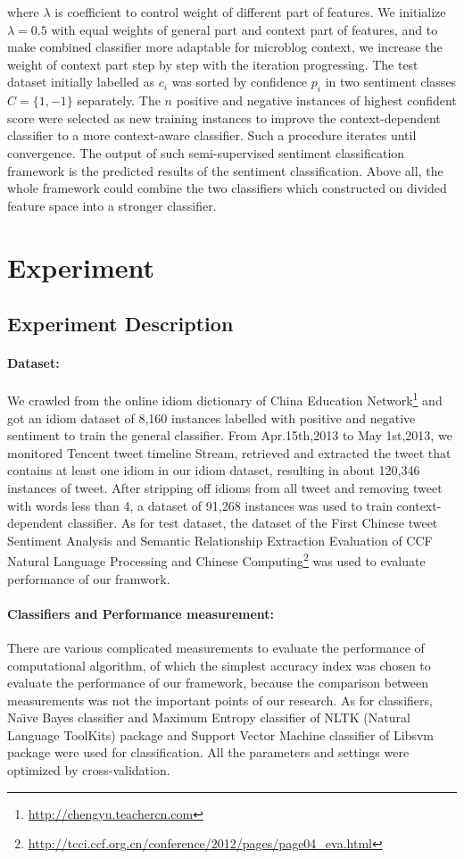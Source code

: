 \documentclass{llncs}
\begin{document}
where $ \lambda $ is coefficient to control weight of different part of features. 
We initialize $ \lambda = 0.5 $ with equal weights of general part and context part of features, and to make combined classifier more adaptable for microblog context,  we  increase the weight of context part step by step with the iteration progressing.
The test dataset initially labelled as $ c_{i} $ was sorted by confidence $ p_{i} $ in two sentiment classes $ C=\lbrace 1,-1\rbrace $ separately.
The $ n $  positive and negative instances of highest confident score were selected as new training instances to  improve the context-dependent classifier to a more context-aware classifier. 
Such a procedure iterates until convergence.
The output of such semi-supervised sentiment classification framework is the predicted results of the sentiment classification. 
Above all, the whole framework could combine the two classifiers which constructed on divided feature space into a stronger classifier. 
\section{Experiment}
\label{experiment}
\subsection{Experiment Description}
\paragraph{Dataset:}
We crawled from the online idiom dictionary of China Education
Network\footnote{\url{http://chengyu.teachercn.com}} and got an idiom dataset of 8,160 instances labelled with positive and negative sentiment to train the general classifier. 
From Apr.15th,2013 to May 1st,2013, we monitored Tencent tweet timeline Stream, retrieved and extracted the tweet that contains at least one idiom in our idiom dataset, resulting in about 120,346 instances of tweet. 
After stripping off idioms from all tweet and removing tweet with words less than 4, a dataset of 91,268 instances was used to train context-dependent classifier. 
As for test dataset, the dataset of the First Chinese tweet Sentiment Analysis and Semantic Relationship Extraction Evaluation of CCF Natural Language Processing and Chinese Computing\footnote{\url{http://tcci.ccf.org.cn/conference/2012/pages/page04_eva.html}} was used to evaluate performance of our framwork.
\paragraph{Classifiers and Performance measurement:}
There are various complicated measurements to evaluate the performance of computational algorithm, of which the simplest accuracy index was chosen to evaluate the performance of our framework, because the comparison between measurements was not the important points of our research. 
As for classifiers, Na\"\i ve Bayes classifier and Maximum Entropy classifier of NLTK (Natural Language ToolKits)\cite{xsongx:b27} package and Support Vector Machine classifier of Libsvm\cite{xsongx:b28} package were used for classification. 
All the parameters and settings were optimized by cross-validation.
\end{document}
